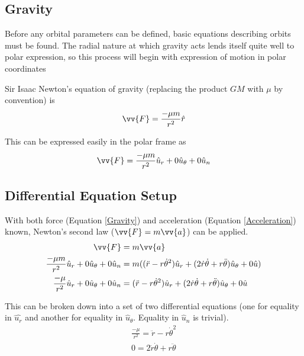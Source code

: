\documentclass{article}
\begin{document}
\bigskip\bigskip
\subsection{Gravity}

Before any orbital parameters can be defined, basic equations describing orbits must be found. The radial nature at which gravity acts lends itself quite well to polar expression, so this process will begin with expression of motion in polar coordinates

Sir Isaac Newton's equation of gravity (replacing the product $GM$ with $\mu$ by convention) is
$$\vv{F}=\frac{-\mu{}m}{r^2}\hat{r}$$

This can be expressed easily in the polar frame as
\begin{equation}\label{Gravity}
    \vv{F}=\frac{-\mu{}m}{r^2}\hat{u}_r+0\hat{u}_\theta+0\hat{u}_n
\end{equation}

\bigskip\bigskip
\subsection{Differential Equation Setup}\label{sec:Differential Equation Setup}

With both force (Equation \eqref{Gravity}) and acceleration (Equation \eqref{Acceleration}) known, Newton's second law ($\vv{F}=m\vv{a}$) can be applied.
\begin{align*}
    \vv{F}                                                  & =m\vv{a}                                                                                              \\
    \frac{-\mu{}m}{r^2}\hat{u}_r+0\hat{u}_\theta+0\hat{u}_n & = m((\ddot{r}-r\dot{\theta}^2)\hat{u}_r+(2\dot{r}\dot{\theta}+r\ddot{\theta})\hat{u}_\theta+0\hat{u}) \\
    \frac{-\mu{}}{r^2}\hat{u}_r+0\hat{u}_\theta+0\hat{u}_n  & = (\ddot{r}-r\dot{\theta}^2)\hat{u}_r+(2\dot{r}\dot{\theta}+r\ddot{\theta})\hat{u}_\theta+0\hat{u}
\end{align*}

This can be broken down into a set of two differential equations (one for equality in $\hat{u_r}$ and another for equality in $\hat{u}_\theta$. Equality in $\hat{u}_n$ is trivial).
\begin{subequations}\label{Differential Equation}
    \begin{align}
        \frac{-\mu{}}{r^2} = \ddot{r}-r\dot{\theta}^2\label{Differential Equation:r} \\
        0  = 2\dot{r}\dot{\theta}+r\ddot{\theta}\label{Differential Equation:theta}
    \end{align}
\end{subequations}
\end{document}
